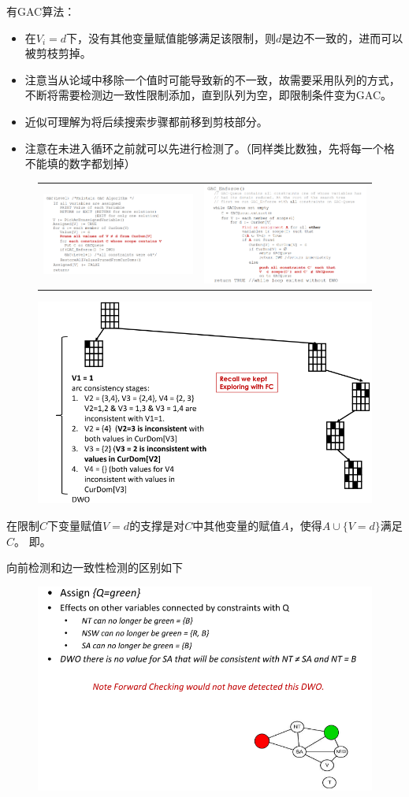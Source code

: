 有GAC算法：
\begin{itemize}
\item 在$V_i=d$下，没有其他变量赋值能够满足该限制，则$d$是边不一致的，进而可以被剪枝剪掉。
\item 注意当从论域中移除一个值时可能导致新的不一致，故需要采用队列的方式，不断将需要检测边一致性限制添加，直到队列为空，即限制条件变为GAC。
\item 近似可理解为将后续搜索步骤都前移到剪枝部分。
\item 注意在未进入循环之前就可以先进行检测了。（同样类比数独，先将每一个格不能填的数字都划掉）
\end{itemize}
\begin{figure}[H]
\centering
\begin{tabular}{cc}
\includegraphics[width=0.5\linewidth]{fig/gac.png}&
\includegraphics[width=0.5\linewidth]{fig/gac_enforce.png}
\end{tabular}
\end{figure}
\begin{figure}[H]
\centering
\includegraphics[width=0.6\linewidth]{fig/gac_eg.png}
\end{figure}

\begin{definition}[支撑]
在限制$C$下变量赋值$V=d$的支撑是对$C$中其他变量的赋值$A$，使得$A\cup\{V=d\}$满足$C$。
即。
\end{definition}

向前检测和边一致性检测的区别如下
\begin{figure}[H]
\centering
\includegraphics[width=0.8\linewidth]{fig/diff_fc_gac.png}
\end{figure}